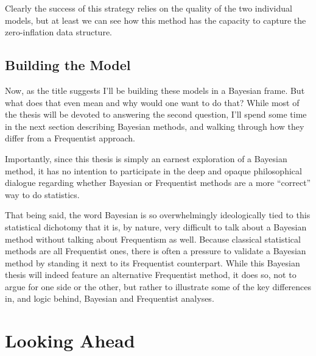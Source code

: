 \documentclass[12pt,twoside]{reedthesis}
\begin{document}
Clearly the success of this strategy relies on the quality of the two individual models, but at least we can see how this method has the capacity to capture the zero-inflation data structure.

\hypertarget{building-the-model}{%
\subsection{Building the Model}\label{building-the-model}}

Now, as the title suggests I'll be building these models in a Bayesian frame. But what does that even mean and why would one want to do that? While most of the thesis will be devoted to answering the second question, I'll spend some time in the next section describing Bayesian methods, and walking through how they differ from a Frequentist approach.

Importantly, since this thesis is simply an earnest exploration of a Bayesian method, it has no intention to participate in the deep and opaque philosophical dialogue regarding whether Bayesian or Frequentist methods are a more ``correct'' way to do statistics.

That being said, the word Bayesian is so overwhelmingly ideologically tied to this statistical dichotomy that it is, by nature, very difficult to talk about a Bayesian method without talking about Frequentism as well. Because classical statistical methods are all Frequentist ones, there is often a pressure to validate a Bayesian method by standing it next to its Frequentist counterpart. While this Bayesian thesis will indeed feature an alternative Frequentist method, it does so, not to argue for one side or the other, but rather to illustrate some of the key differences in, and logic behind, Bayesian and Frequentist analyses.

\hypertarget{looking-ahead}{%
\section{Looking Ahead}\label{looking-ahead}}
\end{document}
